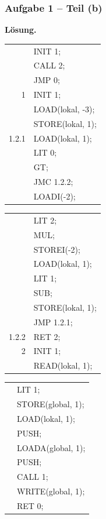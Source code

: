 \documentclass{beamer}
\begin{document}
\begin{frame} \frametitle{Aufgabe 1 -- Teil (b)}
	\scriptsize
	\textbf{Lösung.}
	
	\begin{minipage}{\dimexpr0.33\linewidth-\fboxrule-\fboxsep}
		\begin{tabular}{>{\ttfamily}r >{\ttfamily}l}
			& INIT 1; \\
			& CALL 2; \\
			& JMP 0; \\
			\textcolor{cdgray!50}{\tiny 1} & INIT 1; \\
			& LOAD(lokal, -3); \\
			& STORE(lokal, 1); \\
			\textcolor{cdgray!50}{\tiny 1.2.1} & LOAD(lokal, 1); \\
			& LIT 0; \\
			& GT; \\
			& JMC 1.2.2; \\
			& LOADI(-2); \\
		\end{tabular}
	\end{minipage}
	\begin{minipage}{\dimexpr0.33\linewidth-\fboxrule-\fboxsep}
		\begin{tabular}{>{\ttfamily}r >{\ttfamily}l}
			& LIT 2; \\
			& MUL; \\
			& STOREI(-2); \\
			& LOAD(lokal, 1); \\
			& LIT 1; \\
			& SUB; \\
			& STORE(lokal, 1); \\
			& JMP 1.2.1; \\
			\textcolor{cdgray!50}{\tiny 1.2.2} & RET 2; \\
			\textcolor{cdgray!50}{\tiny 2} & INIT 1; \\
			& READ(lokal, 1); \\
		\end{tabular}
	\end{minipage}
	\begin{minipage}{\dimexpr0.33\linewidth-\fboxrule-\fboxsep}
		\begin{tabular}{>{\ttfamily}r >{\ttfamily}l}
			& LIT 1; \\
			& STORE(global, 1); \\
			& LOAD(lokal, 1); \\
			& PUSH; \\
			& LOADA(global, 1); \\
			& PUSH; \\
			& CALL 1; \\
			& WRITE(global, 1); \\
			& RET 0; \\
		\end{tabular}
	\end{minipage}
\end{frame}
\end{document}
